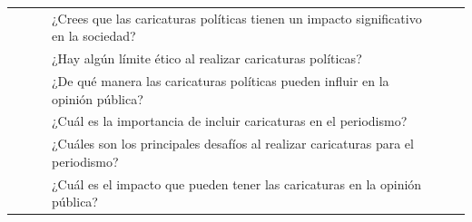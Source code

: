 \documentclass[12pt,a4paper]{article}
\begin{document}
\begin{landscape}
\begin{table}[ht!]
\begin{tabular}{clllcc}
			                                                       &                           &                                     & ¿Crees que las caricaturas políticas tienen un impacto significativo en la sociedad?                   &                                                                                                                                                        \\\cline{3-4}
			                                                       &                           & \multirow{2}{*}{\gbbbbbbbbbbbb}     & ¿Hay algún límite ético al realizar caricaturas políticas?                                             &                                                                                                                                                        \\\cline{4-4}
			                                                       &                           &                                     & ¿De qué manera las caricaturas políticas pueden influir en la opinión pública?                         &                                                                                                                                                        \\\cline{2-4}
			                                                       & \multirow{7}{*}{\dimiiii} & \multirow{2}{*}{\gbbbbbbbbbbbbb}    & ¿Cuál es la importancia de incluir caricaturas en el periodismo?                                       &                                                                                                                                                        \\\cline{4-4}
			                                                       &                           &                                     & ¿Cuáles son los principales desafíos al realizar caricaturas para el periodismo?                       &                                                                                                                                                        \\\cline{3-4}
			                                                       &                           & \multirow{1}{*}{\gbbbbbbbbbbbbbb}   & ¿Cuál es el impacto que pueden tener las caricaturas en la opinión pública?                            &                                                                                                                                                        \\\cline{3-4}

\end{tabular}
\end{table}
\end{landscape}
\end{document}
